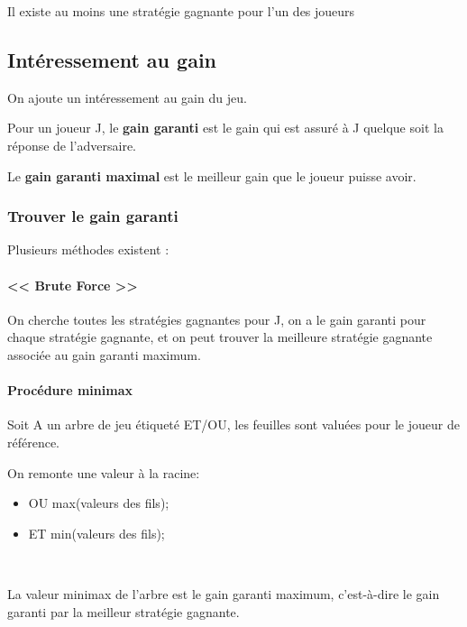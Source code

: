 \documentclass[12pt,a4paper,openany]{book}
\begin{document}
	\begin{attention}
		Il existe au moins une stratégie gagnante pour l'un des joueurs
	\end{attention}

	\subsection{Intéressement au gain}
	On ajoute un intéressement au gain du jeu.

	\begin{definition}
		Pour un joueur J, le \textbf{gain garanti} est le gain qui est assuré à J quelque soit la réponse de l'adversaire.
	\end{definition}

	\begin{definition}
		Le \textbf{gain garanti maximal} est le meilleur gain que le joueur puisse avoir.
	\end{definition}


	\subsubsection{Trouver le gain garanti}
	Plusieurs méthodes existent : 
	\paragraph{<< Brute Force >>} On cherche toutes les stratégies gagnantes pour J, on a le gain garanti pour chaque stratégie gagnante, et on peut trouver la meilleure stratégie gagnante associée au gain garanti maximum.

	\paragraph{Procédure minimax} Soit A un arbre de jeu étiqueté ET/OU, les feuilles sont valuées pour le joueur de référence.

On remonte une valeur à la racine:
\begin{itemize}
	\item OU max(valeurs des fils);
	\item ET min(valeurs des fils);
\end{itemize}
~

	\begin{attention}
		La valeur minimax de l'arbre est le gain garanti maximum, c'est-à-dire le gain garanti par la meilleur stratégie gagnante.
	\end{attention}
\end{document}
